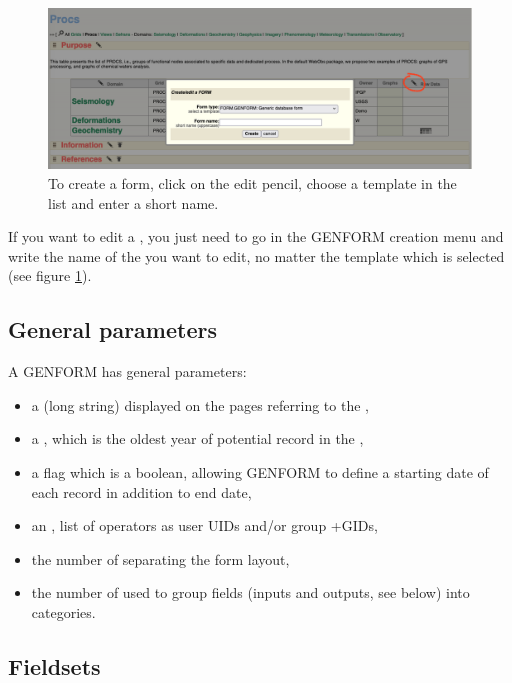 \begin{figure}[!h]
	\centering
	\includegraphics[width=\textwidth]{figures/GENFORM_creation.png}
	\caption{To create a form, click on the edit pencil, choose a template in the list and enter a short name.}
	\label{GENFORM_creation}
\end{figure}

If you want to edit a , you just need to go in the GENFORM creation menu and write the name of the  you want to edit, no matter the template which is selected (see figure \ref{GENFORM_creation}).


\subsection{General parameters}


A GENFORM  has general parameters:
\begin{itemize}
	\item a  (long string) displayed on the pages referring to the ,
	\item a , which is the oldest year of potential record in the ,
	\item a  flag which is a boolean, allowing GENFORM to define a starting date of each record in addition to end date,
	\item an , list of operators as user UIDs and/or group +GIDs,
	\item the number of  separating the form layout,
	\item the number of  used to group fields (inputs and outputs, see below) into categories.
\end{itemize}

\subsection{Fieldsets}

